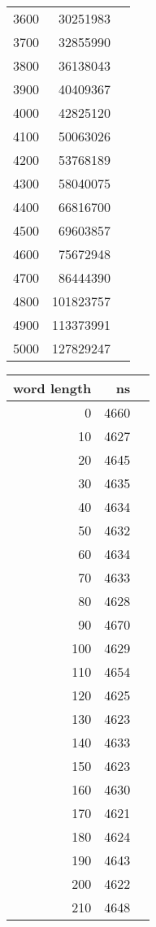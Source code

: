 \begin{figure}[H]
\begin{tabular}{r r r}
        3600 & 30251983 \\
        3700 & 32855990 \\
        3800 & 36138043 \\
        3900 & 40409367 \\
        4000 & 42825120 \\
        4100 & 50063026 \\
        4200 & 53768189 \\
        4300 & 58040075 \\
        4400 & 66816700 \\
        4500 & 69603857 \\
        4600 & 75672948 \\
        4700 & 86444390 \\
        4800 & 101823757 \\
        4900 & 113373991 \\
        5000 & 127829247 \\
        \bottomrule
    \end{tabular}
    \quad
    \begin{tabular}{r r r}
        \toprule
        \textbf{word length} & \textbf{ns} \\
        \midrule
        0 & 4660 \\
        10 & 4627 \\
        20 & 4645 \\
        30 & 4635 \\
        40 & 4634 \\
        50 & 4632 \\
        60 & 4634 \\
        70 & 4633 \\
        80 & 4628 \\
        90 & 4670 \\
        100 & 4629 \\
        110 & 4654 \\
        120 & 4625 \\
        130 & 4623 \\
        140 & 4633 \\
        150 & 4623 \\
        160 & 4630 \\
        170 & 4621 \\
        180 & 4624 \\
        190 & 4643 \\
        200 & 4622 \\
        210 & 4648 \\

\end{tabular}
\end{figure}
